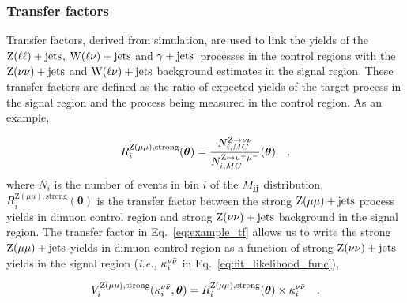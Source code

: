 
\subsubsection{Transfer factors}
\label{subsubsec:transfer_factors}

Transfer factors, derived from simulation,
are used to link the yields of the $\mathrm{Z}(\ell\ell)+\textrm{jets}$, $\textrm{W}(\ell\nu)+\textrm{jets}$ and $\gamma+\textrm{jets}$~processes in the control
regions with the $\textrm{Z}(\nu\nu)+\textrm{jets}$ and $\textrm{W}(\ell\nu)+\textrm{jets}$ background estimates in the signal region.
These transfer factors are defined as the ratio of expected yields of the target process
in the signal region and the process being measured in the control region. As an example,

\begin{equation}
  R_{i}^{\mathrm{Z}(\mu\mu), \mathrm{strong}}(\boldsymbol{\theta}) = \frac{N_{i,MC}^{\mathrm{Z}\to\nu\nu}}{N_{i,MC}^{\mathrm{Z}\to\mu^+\mu^-}}(\boldsymbol{\theta}) \quad ,
  \label{eq:example_tf}
\end{equation}
where $N_{i}$ is the number of events in bin $i$ of the $M_{\textrm{jj}}$ distribution, 
$R_{i}^{\mathrm{Z}(\mu\mu), \mathrm{strong}}(\boldsymbol{\theta})$ is the transfer factor between the 
strong $\mathrm{Z}(\mu\mu)+\textrm{jets}$ process yields in dimuon control region 
and strong $\textrm{Z}(\nu\nu)+\textrm{jets}$ background in the signal region. The transfer factor in
Eq.~\ref{eq:example_tf} allows us to write the strong $\mathrm{Z}(\mu\mu)+\textrm{jets}$ yields
in dimuon control region as a function of strong $\textrm{Z}(\nu\nu)+\textrm{jets}$ yields in the signal region
(\textit{i.e.,} $\kappa_{i}^{\nu\bar{\nu}}$ in Eq.~\ref{eq:fit_likelihood_func}),

\begin{equation}
  V_{i}^{\mathrm{Z}(\mu\mu), \mathrm{strong}}(\kappa_{i}^{\nu\bar{\nu}},\boldsymbol{\theta}) = R_{i}^{\mathrm{Z}(\mu\mu), \mathrm{strong}}(\boldsymbol{\theta}) \times \kappa_{i}^{\nu\bar{\nu}} \quad .
\end{equation}

